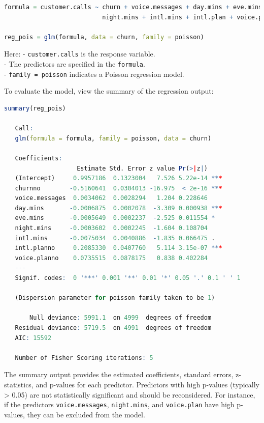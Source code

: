 \documentclass[
]{book}
\newcommand{\passthrough}[1]{#1}
\theoremstyle{definition}
\theoremstyle{definition}
\theoremstyle{definition}
\theoremstyle{definition}
\theoremstyle{remark}
\begin{document}
\begin{lstlisting}[language=R]
formula = customer.calls ~ churn + voice.messages + day.mins + eve.mins + 
                           night.mins + intl.mins + intl.plan + voice.plan

reg_pois = glm(formula, data = churn, family = poisson)
\end{lstlisting}

Here:
- \passthrough{\lstinline!customer.calls!} is the response variable.\\
- The predictors are specified in the \passthrough{\lstinline!formula!}.\\
- \passthrough{\lstinline!family = poisson!} indicates a Poisson regression model.

To evaluate the model, view the summary of the regression output:

\begin{lstlisting}[language=R]
summary(reg_pois)
   
   Call:
   glm(formula = formula, family = poisson, data = churn)
   
   Coefficients:
                    Estimate Std. Error z value Pr(>|z|)    
   (Intercept)     0.9957186  0.1323004   7.526 5.22e-14 ***
   churnno        -0.5160641  0.0304013 -16.975  < 2e-16 ***
   voice.messages  0.0034062  0.0028294   1.204 0.228646    
   day.mins       -0.0006875  0.0002078  -3.309 0.000938 ***
   eve.mins       -0.0005649  0.0002237  -2.525 0.011554 *  
   night.mins     -0.0003602  0.0002245  -1.604 0.108704    
   intl.mins      -0.0075034  0.0040886  -1.835 0.066475 .  
   intl.planno     0.2085330  0.0407760   5.114 3.15e-07 ***
   voice.planno    0.0735515  0.0878175   0.838 0.402284    
   ---
   Signif. codes:  0 '***' 0.001 '**' 0.01 '*' 0.05 '.' 0.1 ' ' 1
   
   (Dispersion parameter for poisson family taken to be 1)
   
       Null deviance: 5991.1  on 4999  degrees of freedom
   Residual deviance: 5719.5  on 4991  degrees of freedom
   AIC: 15592
   
   Number of Fisher Scoring iterations: 5
\end{lstlisting}

The summary output provides the estimated coefficients, standard errors, z-statistics, and p-values for each predictor. Predictors with high p-values (typically \textgreater{} 0.05) are not statistically significant and should be reconsidered. For instance, if the predictors \passthrough{\lstinline!voice.messages!}, \passthrough{\lstinline!night.mins!}, and \passthrough{\lstinline!voice.plan!} have high p-values, they can be excluded from the model.
\end{document}

